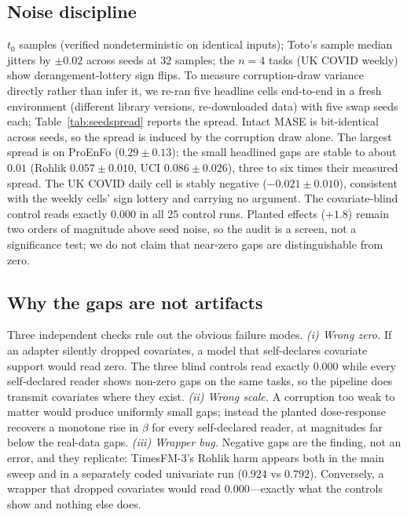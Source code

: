\documentclass[letterpaper]{article}
\begin{document}
\subsection{Noise discipline}
$t_0$ samples (verified nondeterministic on identical inputs); Toto's sample median
jitters by $\pm 0.02$ across seeds at 32 samples; the $n=4$ tasks (UK COVID weekly)
show derangement-lottery sign flips. To measure corruption-draw variance directly
rather than infer it, we re-ran five headline cells end-to-end in a fresh environment
(different library versions, re-downloaded data) with five swap seeds each;
Table~\ref{tab:seedspread} reports the spread. Intact MASE is bit-identical across
seeds, so the spread is induced by the corruption draw alone. The largest spread is on
ProEnFo ($0.29\pm0.13$); the small headlined gaps are stable to about $0.01$ (Rohlik
$0.057\pm0.010$, UCI $0.086\pm0.026$), three to six times their measured spread. The
UK COVID daily cell is stably negative ($-0.021\pm0.010$), consistent with the weekly
cells' sign lottery and carrying no argument. The covariate-blind control reads exactly
$0.000$ in all 25 control runs. Planted effects ($+1.8$) remain two orders of
magnitude above seed noise, so the audit is a screen, not a significance test; we do
not claim that near-zero gaps are distinguishable from zero.



\subsection{Why the gaps are not artifacts}
Three independent checks rule out the obvious failure modes.
\emph{(i) Wrong zero.} If an adapter silently dropped covariates, a model that
self-declares covariate support would read zero. The three blind controls read exactly
$0.000$ while every self-declared reader shows non-zero gaps on the same tasks, so the
pipeline does transmit covariates where they exist.
\emph{(ii) Wrong scale.} A corruption too weak to matter would produce uniformly small
gaps; instead the planted dose-response recovers a monotone rise in $\beta$ for every
self-declared reader, at magnitudes far below the real-data gaps.
\emph{(iii) Wrapper bug.} Negative gaps are the finding, not an error, and they
replicate: TimesFM-3's Rohlik harm appears both in the main sweep and in a separately
coded univariate run ($0.924$ vs $0.792$). Conversely, a wrapper that dropped
covariates would read $0.000$---exactly what the controls show and nothing else does.
\end{document}
